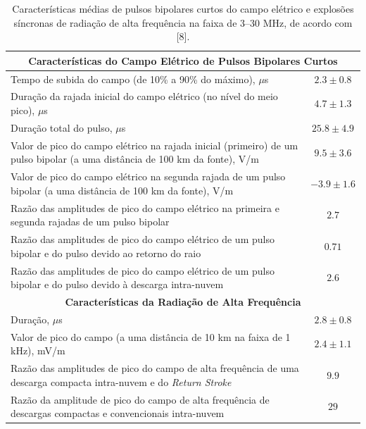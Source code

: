 \documentclass[a4paper, 12pt, onecolumn,singlespacing]{article}
\begin{document}
	\begin{table}[htbp]
		\centering
		\label{tabela01}
		\caption{Características médias de pulsos bipolares curtos do campo elétrico e explosões síncronas de radiação de alta frequência na faixa de 3--30 MHz, de acordo com [8].}
		\begin{tabularx}{\textwidth}{@{}p{12cm}c@{}}
			\toprule
			\multicolumn{2}{c}{\textbf{Características  do Campo Elétrico de Pulsos Bipolares Curtos}} \\
			\midrule
			Tempo de subida do campo (de 10\% a 90\% do máximo), $\mu$s & $2.3 \pm 0.8$ \\
			Duração da rajada inicial do campo elétrico (no nível do meio pico), $\mu$s & $4.7 \pm 1.3$ \\
			Duração total do pulso, $\mu$s & $25.8 \pm 4.9$ \\
			Valor de pico do campo elétrico na rajada inicial (primeiro) de um pulso bipolar (a uma distância de 100 km da fonte), V/m & $9.5 \pm 3.6$ \\
			Valor de pico do campo elétrico na segunda rajada de um pulso bipolar (a uma distância de 100 km da fonte), V/m & $-3.9 \pm 1.6$ \\
			Razão das amplitudes de pico do campo elétrico na primeira e segunda rajadas de um pulso bipolar & $2.7$ \\
			Razão das amplitudes de pico do campo elétrico de um pulso bipolar e do pulso devido ao retorno do raio & $0.71$ \\
			Razão das amplitudes de pico do campo elétrico de um pulso bipolar e do pulso devido à descarga intra-nuvem & $2.6$ \\
			\midrule
			\multicolumn{2}{c}{\textbf{Características da Radiação de Alta Frequência}} \\
			\midrule
			Duração, $\mu$s & $2.8 \pm 0.8$ \\
			Valor de pico do campo (a uma distância de 10 km na faixa de 1 kHz), mV/m & $2.4 \pm 1.1$ \\
			Razão das amplitudes de pico do campo de alta frequência de uma descarga compacta intra-nuvem e do \textit{Return Stroke} & $9.9$ \\
			Razão da amplitude de pico do campo de alta frequência de descargas compactas e convencionais intra-nuvem & $29$ \\
			\bottomrule
		\end{tabularx}
	\end{table}
\end{document}
